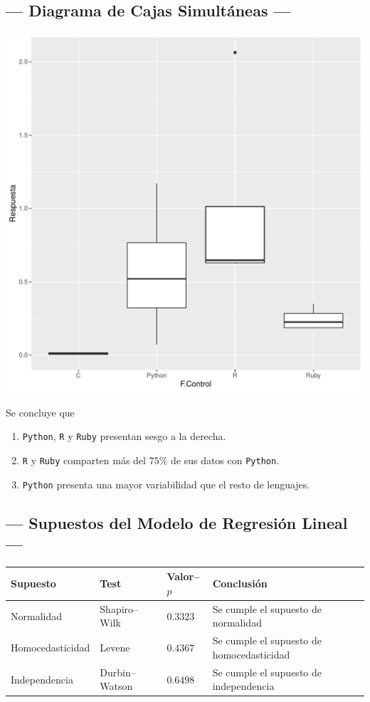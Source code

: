 \documentclass[11pt,a4paper]{article}
\begin{document}
\subsection{--- Diagrama de Cajas Simultáneas ---} %
\label{sub:cajas}
\begin{minipage}{0.65\linewidth}
	\includegraphics[width= 0.9 \linewidth, page = 1]{IMAGENES/9/RPlots.pdf}
\end{minipage}
\begin{minipage}{0.35\linewidth}
	Se concluye que
	\begin{enumerate}
		\item \texttt{Python}, \texttt{R} y \texttt{Ruby} presentan sesgo a la derecha.
		\item \texttt{R}  y \texttt{Ruby} comparten más del \(75\)\textsc{\%} de sus datos con \texttt{Python}.
		\item \texttt{Python} presenta una mayor variabilidad que el resto de lenguajes.
	\end{enumerate}
\end{minipage}

\subsection{--- Supuestos del Modelo de Regresión Lineal ---} %
\label{sub:supuestos_modelo}
\begin{table}[hbt!]
	\centering
	\begin{tabular}{|*{4}{l|}}
		\hline 
		Supuesto & Test & Valor--\(p\) & Conclusión \\ \hline
		Normalidad & Shapiro--Wilk & \(0.3323\) & Se cumple el supuesto de normalidad \\ \hline
		Homocedasticidad & Levene & \(0.4367\) & Se cumple el supuesto de homocedasticidad \\ \hline
		Independencia & Durbin--Watson & \(0.6498\) & Se cumple el supuesto de independencia \\ \hline
	\end{tabular}
	\label{tab:supuestos}
\end{table}
\end{document}
